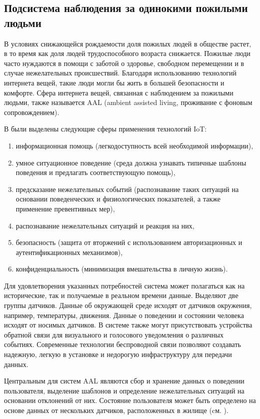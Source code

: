 \subsection{Подсистема наблюдения за одинокими пожилыми людьми}

В условиях снижающейся рождаемости доля пожилых людей в обществе растет, в то время как доля людей трудоспособного возраста снижается. Пожилые люди часто нуждаются в помощи с заботой о здоровье, свободном перемещении и в случае нежелательных происшествий. Благодаря использованию технологий интернета вещей, такие люди могли бы жить в большей безопасности и комфорте. Сфера интернета вещей, связанная с наблюдением за пожилыми людьми, также называется AAL (ambient assisted living, проживание с фоновым сопровождением).

В  были выделены следующие сферы применения технологий IoT:

\begin{enumerate}
	\item информационная 	помощь 	(легкодоступность 	всей 	необходимой информации),
	\item умное ситуационное поведение (среда должна узнавать типичные шаблоны поведения и предлагать соответствующую помощь),
	\item предсказание нежелательных событий (распознавание таких ситуаций на основании поведенческих и физиологических показателей, а также применение превентивных мер),
	\item распознавание нежелательных ситуаций и реакция на них,
	\item безопасность (защита от вторжений с использованием авторизационных и аутентификационных механизмов),
	\item конфиденциальность (минимизация вмешательства в личную жизнь).
\end{enumerate}

Для удовлетворения указанных потребностей система может полагаться как на исторические, так и получаемые в реальном времени данные. Выделяют две группы датчиков. Данные об окружающей среде исходят от датчиков окружения, например, температуры, движения. Данные о поведении и состоянии человека исходят от носимых датчиков. В системе также могут присутствовать устройства обратной связи для визуального и голосового уведомления о различных событиях. Современные технологии беспроводной связи позволяют создавать надежную, легкую в установке и недорогую инфраструктуру для передачи данных.

Центральным для систем AAL являются сбор и хранение данных о поведении пользователя, выделение шаблонов и определение нежелательных ситуаций на основании отклонений от них. Состояние пользователя может быть определено на основе данных от нескольких датчиков, расположенных в жилище (cм. ).

